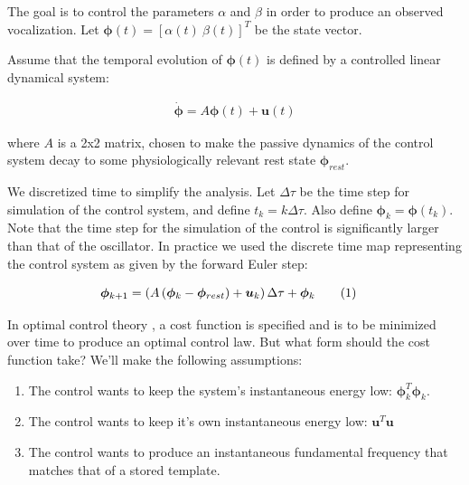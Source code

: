 \documentclass{article} %
\newcommand\numberthis{\addtocounter{equation}{1}\tag{\theequation}}
\begin{document}
The goal is to control the parameters $\alpha$ and $\beta$ in order to produce an observed
vocalization. Let $\bm{\phi}(t) = \left[ \alpha(t) ~ \beta(t) \right]^T$ be the state vector.

Assume that the temporal evolution of $\bm{\phi}(t)$ is defined by a controlled linear dynamical
system:

\begin{align*}
\dot{\bm{\phi}}=A\bm{\phi}(t) + \bm{u}(t)
\end{align*}

where $A$ is a 2x2 matrix, chosen to make the passive dynamics of the control system decay
to some physiologically relevant rest state $\bm{\phi}_{rest}$.

We discretized time to simplify the analysis. Let $\Delta\tau$ be the time step for
simulation of the control system, and define $t_k = k\Delta\tau$. Also define
$\bm{\phi}_k = \bm{\phi}(t_k)$. Note that the time step for the simulation of the
control is significantly larger than that of the oscillator. In practice we used the
discrete time map representing the control system as given by the forward Euler step:

\begin{align*}
\bm{\phi}_{k+1} &= \begin{aligned}\left( A \left( \bm{\phi}_k - \bm{\phi}_{rest} \right) + \bm{u}_k \right) \Delta\tau + \bm{\phi}_{k}\end{aligned} \numberthis \label{eq_control}
\end{align*}

In optimal control theory \cite{Todorov2002}, a cost function is specified and is to be minimized over time to
produce an optimal control law. But what form should the cost function take? We'll make
the following assumptions:

\begin{enumerate}

\item The control wants to keep the system's instantaneous energy low: $\bm{\phi}_k^T \bm{\phi}_k$.
\item The control wants to keep it's own instantaneous energy low: $\bm{u}^T \bm{u}$ 
\item The control wants to produce an instantaneous fundamental frequency that matches that of a stored template.

\end{enumerate}
\end{document}
